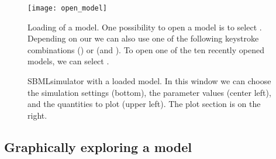 \begin{figure}[t]
\centering
\texttt{[image: open\_model]}
\caption[Loading of a model]{Loading of a model.
One possibility to open a model is to select .
Depending on our \OS we can also use one of the following keystroke combinations  (\MacOSX) or  (\Linux and \Windows).
To open one of the ten recently opened models, we can select .}
\label{fig:openModel}
\end{figure}
\begin{figure}[t]
\centering
{}
\caption[SBMLsimulator with a loaded model]{SBMLsimulator with a loaded model.
In this window we can choose the simulation settings (bottom), the parameter values (center left), and the quantities to plot (upper left).
The plot section is on the right.}
\label{fig:modelOpened}
\end{figure}

\subsection{Graphically exploring a model}
\label{sec:ModelTree}

